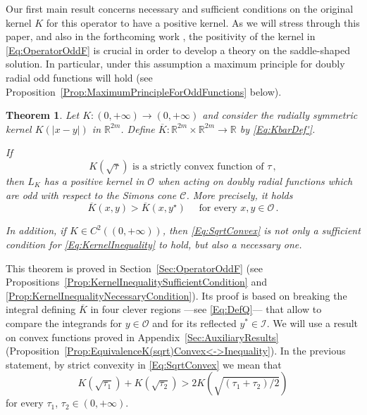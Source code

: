 \documentclass[12pt,reqno]{amsart}
\newtheorem{theorem}{Theorem}[section]
\theoremstyle{definition}
\theoremstyle{remark}
\newcommand{\con}[1]{\mathbb{#1}}
\newcommand{\R}{\con{R}} %
\newcommand{\ccal}{\mathscr{C}}
\newcommand{\ical}{\mathcal{I}}
\newcommand{\ocal}{\mathcal{O}}
\numberwithin{equation}{section}
\begin{document}
Our first main result concerns necessary and sufficient conditions on the original kernel $K$ for this operator to have a positive kernel.  As we will stress through this paper, and also in the forthcoming work \cite{FelipeSanz-Perela:IntegroDifferentialII}, the positivity of the kernel in \eqref{Eq:OperatorOddF} is crucial in order to develop a theory on the saddle-shaped solution. In particular, under this assumption a maximum principle for doubly radial odd functions will hold (see Proposition~\ref{Prop:MaximumPrincipleForOddFunctions} below).

\begin{theorem}
	\label{Th:SufficientNecessaryConditions}
	Let $K:(0,+\infty) \to (0,+\infty)$ and consider the radially symmetric kernel $K(|x-y|)$ in $\R^{2m}$. Define $\overline{K} : \R^{2m}\times \R^{2m} \to \R$ by \eqref{Eq:KbarDef'}.
	
	If 
	\begin{equation}
	\label{Eq:SqrtConvex}	
	K(\sqrt{\tau}) \text{ is a strictly convex function of }\tau\,,
	\end{equation}
	then $L_K$ has a positive kernel in $\ocal$ when acting on doubly radial functions which are odd with respect to the Simons cone $\ccal$. More precisely, it holds
	\begin{equation}
	\label{Eq:KernelInequality}
	\overline{K}(x,y) > \overline{K}(x, y^\star) \quad \text{ for every }x,y \in \ocal\,.
	\end{equation}
	
	In addition, if $K\in C^2((0,+\infty))$, then \eqref{Eq:SqrtConvex} is not only a sufficient condition for \eqref{Eq:KernelInequality} to hold, but also a necessary one.
\end{theorem}

This theorem is proved in Section~\ref{Sec:OperatorOddF} (see Propositions~\ref{Prop:KernelInequalitySufficientCondition} and \ref{Prop:KernelInequalityNecessaryCondition}). Its proof is based on breaking the integral defining $\overline{K}$ in four clever regions ---see \eqref{Eq:DefQ}--- that allow to compare the integrands for $y\in \ocal$ and for its reflected $y^*\in \ical$. We will use a result on convex functions proved in Appendix~\ref{Sec:AuxiliaryResults} (Proposition~\ref{Prop:EquivalenceK(sqrt)Convex<->Inequality}). In the previous statement, by strict convexity in \eqref{Eq:SqrtConvex} we mean that
$$
K(\sqrt{\tau_1}) + K(\sqrt{\tau_2}) > 2 K(\sqrt{(\tau_1 + \tau_2)/2})
$$
for every $\tau_1$, $\tau_2 \in (0,+\infty)$.
\end{document}
